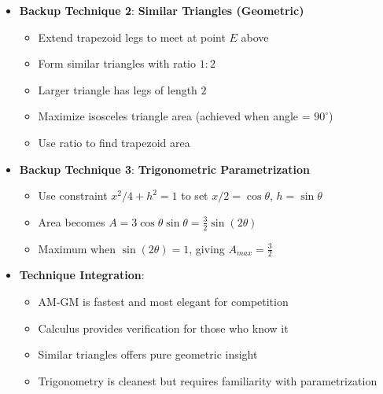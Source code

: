 \documentclass[12pt]{article}
\begin{document}
\begin{techniquesbox}
\begin{itemize}[leftmargin=*]
    \item \textbf{Backup Technique 2}: \textbf{Similar Triangles (Geometric)}
    \begin{itemize}
        \item Extend trapezoid legs to meet at point $E$ above
        \item Form similar triangles with ratio $1:2$
        \item Larger triangle has legs of length $2$
        \item Maximize isosceles triangle area (achieved when angle = $90^\circ$)
        \item Use ratio to find trapezoid area
    \end{itemize}
    
    \item \textbf{Backup Technique 3}: \textbf{Trigonometric Parametrization}
    \begin{itemize}
        \item Use constraint $x^2/4 + h^2 = 1$ to set $x/2 = \cos\theta$, $h = \sin\theta$
        \item Area becomes $A = 3\cos\theta \sin\theta = \frac{3}{2}\sin(2\theta)$
        \item Maximum when $\sin(2\theta) = 1$, giving $A_{max} = \frac{3}{2}$
    \end{itemize}
    
    \item \textbf{Technique Integration}: 
    \begin{itemize}
        \item AM-GM is fastest and most elegant for competition
        \item Calculus provides verification for those who know it
        \item Similar triangles offers pure geometric insight
        \item Trigonometry is cleanest but requires familiarity with parametrization
    \end{itemize}
\end{itemize}
\end{techniquesbox}
\end{document}
